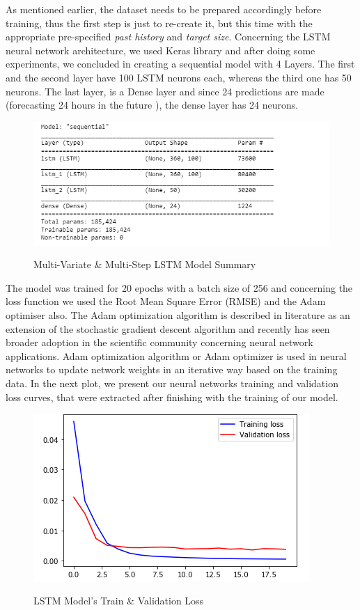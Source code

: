 \par 
As mentioned earlier, the dataset needs to be prepared accordingly before training, thus the first step is just to re-create it, but this time with the appropriate pre-specified \textit{past history} and \textit{target size}. Concerning the LSTM neural network architecture, we used Keras library \cite{keras} and after doing some experiments, we concluded in creating a sequential model with 4 Layers. The first and the second layer have 100 LSTM neurons each, whereas the third one has 50 neurons. The last layer, is a Dense layer and since 24 predictions are made (forecasting 24 hours in the future ), the dense layer has 24 neurons. 
\begin{figure}[h!]
\centering
\includegraphics[width=0.8\linewidth]{project/lstmsummary.PNG}
\label{fig:felix}
\caption{Multi-Variate \& Multi-Step LSTM Model Summary}
\end{figure}
The model was trained for 20 epochs with a batch size of 256 and concerning the loss function we used the Root Mean Square Error (RMSE) and the Adam optimiser also. The Adam optimization algorithm is described in literature as an extension of the stochastic gradient descent algorithm and recently has seen broader adoption in the scientific community concerning neural network applications.  Adam optimization algorithm or Adam optimizer is used in neural networks to update network weights in an iterative way based on the training data. In the next plot, we present our neural networks training and validation loss curves, that were extracted after finishing with the training of our model.
\begin{figure}[h!]
\centering
\includegraphics[width=0.7\linewidth]{project/tl.png}
\label{fig:felix}
\caption{LSTM Model's Train \& Validation Loss}
\end{figure}
